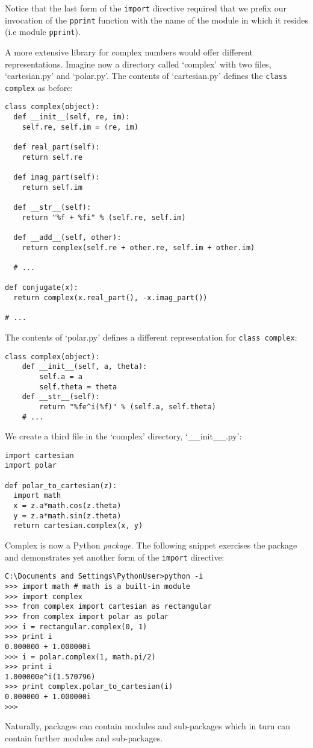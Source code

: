 Notice that the last form of the \verb|import| directive required that
we prefix our invocation of the \verb|pprint| function with the name
of the module in which it resides (i.e module \verb|pprint|).

A more extensive library for complex numbers would offer different
representations. Imagine now a directory called `complex' with two
files, `cartesian.py' and `polar.py'. The contents of `cartesian.py'
defines the \verb|class complex| as before:
\begin{verbatim}
class complex(object):
  def __init__(self, re, im):
    self.re, self.im = (re, im)

  def real_part(self):
    return self.re

  def imag_part(self):
    return self.im

  def __str__(self):
    return "%f + %fi" % (self.re, self.im)

  def __add__(self, other):
    return complex(self.re + other.re, self.im + other.im)

  # ...

def conjugate(x):
  return complex(x.real_part(), -x.imag_part())

# ...
\end{verbatim}
The contents of `polar.py' defines a different representation for
\verb|class complex|:
\begin{verbatim}
class complex(object):
    def __init__(self, a, theta):
        self.a = a
        self.theta = theta
    def __str__(self):
        return "%fe^i(%f)" % (self.a, self.theta)
    # ...
\end{verbatim}
We create a third file in the `complex' directory, `\_\_init\_\_.py':
\begin{verbatim}
import cartesian
import polar

def polar_to_cartesian(z):
  import math
  x = z.a*math.cos(z.theta)
  y = z.a*math.sin(z.theta)
  return cartesian.complex(x, y)
\end{verbatim}
Complex is now a Python \emph{package}. The following snippet
exercises the package and demonstrates yet another form of the
\verb|import| directive:
\begin{verbatim}
C:\Documents and Settings\PythonUser>python -i
>>> import math # math is a built-in module
>>> import complex
>>> from complex import cartesian as rectangular
>>> from complex import polar as polar
>>> i = rectangular.complex(0, 1)
>>> print i
0.000000 + 1.000000i
>>> i = polar.complex(1, math.pi/2)
>>> print i
1.000000e^i(1.570796)
>>> print complex.polar_to_cartesian(i)
0.000000 + 1.000000i
>>>
\end{verbatim}
Naturally, packages can contain modules and sub-packages which in turn
can contain further modules and sub-packages.

